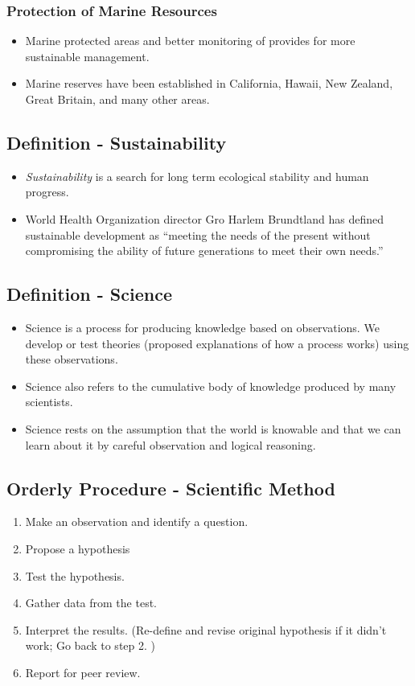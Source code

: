 \documentclass[10pt]{article}
\begin{document}
\subsubsection{Protection of Marine Resources}
\begin{itemize}
    \item Marine protected areas and better monitoring of provides for more sustainable management.
    \item Marine reserves have been established in California, Hawaii, New Zealand, Great Britain, and many other areas.
\end{itemize}

\subsection{Definition - Sustainability}
\begin{itemize}
    \item \textit{Sustainability} is a search for long term ecological stability and human progress.
    \item World Health Organization director Gro Harlem Brundtland has defined sustainable development as ``meeting the needs of the present without compromising the ability of future generations to meet their own needs.''
\end{itemize}

\subsection{Definition - Science}
\begin{itemize}
    \item Science is a process for producing knowledge based on observations. We develop or test theories (proposed explanations of how a process works) using these observations.
    \item Science also refers to the cumulative body of knowledge produced by many scientists.
    \item Science rests on the assumption that the world is knowable and that we can learn about it by careful observation and logical reasoning. 
\end{itemize}

\subsection{Orderly Procedure - Scientific Method}
\begin{enumerate}
    \item Make an observation and identify a question.
    \item Propose a hypothesis
    \item Test the hypothesis.
    \item Gather data from the test.
    \item Interpret the results. (Re-define and revise original hypothesis if it didn't work; Go back to step 2. )
    \item Report for peer review. 
\end{enumerate}
\end{document}
